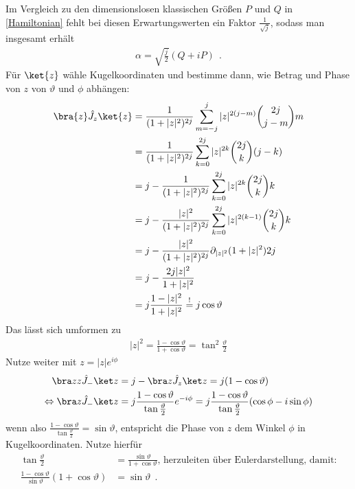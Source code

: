 Im Vergleich zu den dimensionslosen klassischen Größen $P$ und $Q$ in \eqref{Hamiltonian} fehlt bei diesen Erwartungswerten ein Faktor $\frac{1}{\sqrt j}$, sodass man insgesamt erhält
\begin{align}
  \alpha = \sqrt{\frac{j}{2}}(Q +iP)~~.
\end{align}
Für $\ket{z}$ wähle Kugelkoordinaten und bestimme dann, wie Betrag und Phase von $z$ von $\vartheta$ und $\phi$ abhängen:
\begin{align*}
  \bra{z}\hat J_z\ket{z} &= \frac{1}{(1+|z|^2)^{2j}} \sum\limits_{m=-j}^{j} |z|^{2(j-m)} \binom{2j}{j-m} m\\
  &=\frac{1}{(1+|z|^2)^{2j}} \sum\limits_{k=0}^{2j} |z|^{2k} \binom{2j}{k} (j-k)\\
  &= j - \frac{1}{(1+|z|^2)^{2j}} \sum\limits_{k=0}^{2j} |z|^{2k} \binom{2j}{k} k\\
  &= j - \frac{|z|^2}{(1+|z|^2)^{2j}} \sum\limits_{k=0}^{2j} |z|^{2(k-1)} \binom{2j}{k} k\\
  &= j - \frac{|z|^2}{(1+|z|^2)^{2j}} \partial_{|z|^2} (1+|z|^2){2j}\\
  &= j - \frac{2j|z|^2}{1+|z|^2}\\
  &= j \frac{1-|z|^2}{1+|z|^2} \stackrel{!}{=} j \cos\vartheta\\
\end{align*}
 Das lässt sich umformen zu
\begin{align*}
  |z|^2 = \frac{1-\cos\vartheta}{1+\cos\vartheta} = \tan^2\frac{\vartheta}{2}
\end{align*}
Nutze weiter mit $z=|z|e^{i\phi}$
\begin{align*}
  \bra z z\hat J_- \ket z &=  j - \bra z\hat J_z \ket z  = j(1-\cos\vartheta)\\
  \Leftrightarrow \bra z\hat J_- \ket z &= j\frac{1-\cos\vartheta}{\tan\frac{\vartheta}{2}} e^{-i\phi} = j\frac{1-\cos\vartheta}{\tan\frac{\vartheta}{2}} (\cos\phi-i \sin\phi) 
\end{align*}
wenn also $\frac{1-\cos\vartheta}{\tan\frac{\vartheta}{2}}  = \sin \vartheta$, entspricht die Phase von $z$ dem Winkel $\phi$ in Kugelkoordinaten.
Nutze hierfür
\begin{align*}
  \tan\frac{\vartheta}{2} &= \frac{\sin\vartheta}{1+\cos\vartheta} \text{,      herzuleiten über Eulerdarstellung, damit:}\\
  \frac{1-\cos\vartheta}{\sin\vartheta}(1+\cos\vartheta) &= \sin\vartheta~~.
\end{align*}
